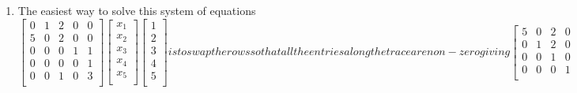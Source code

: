 \begin{enumerate}[label=(\alph*)]
    \item The easiest way to solve this system of equations 
        \begin{subequations}
            \begin{equation}
                \begin{bmatrix}
                    0       &   1       &   2   &   0   &   0   \\
                    5       &   0       &   2   &   0   &   0   \\
                    0       &   0       &   0   &   1   &   1   \\
                    0       &   0       &   0   &   0   &   1   \\
                    0       &   0       &   1   &   0   &   3   \\
                \end{bmatrix}
                \begin{bmatrix}
                    x_{1}   \\
                    x_{2}   \\
                    x_{3}   \\
                    x_{4}   \\
                    x_{5}   \\
                \end{bmatrix}
                \begin{bmatrix}
                    1       \\
                    2       \\
                    3       \\
                    4       \\
                    5       \\
                \end{bmatrix}
            \end{equation}
        is to swap the rows so that all the entries along the trace 
        are non-zero giving 
            \begin{equation}
                \begin{bmatrix}
                    5       &   0       &   2   &   0   &   0   \\
                    0       &   1       &   2   &   0   &   0   \\
                    0       &   0       &   1   &   0   &   3   \\
                    0       &   0       &   0   &   1   &   1   \\

\end{bmatrix}
\end{equation}
\end{subequations}
\end{enumerate}
